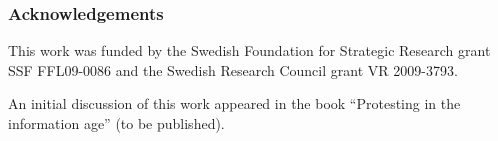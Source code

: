 \mode*

\subsubsection*{Acknowledgements}

This work was funded by the Swedish Foundation for Strategic Research grant SSF 
FFL09-0086 and the Swedish Research Council grant VR 2009-3793.

An initial discussion of this work appeared in the book \enquote{Protesting in
  the information age} (to be published).
